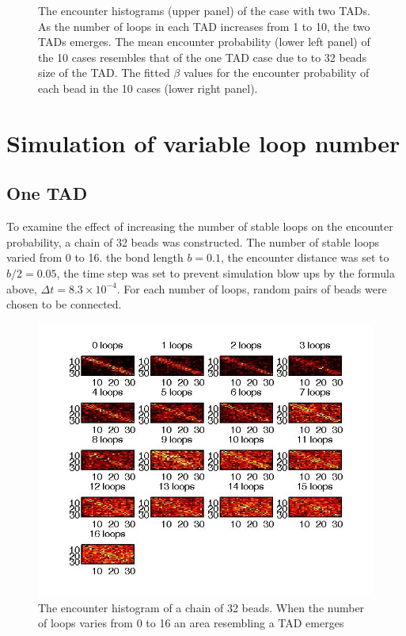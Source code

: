 \documentclass[12pt]{book}
\begin{document}
\begin{figure}[H]
\caption{\scriptsize{The encounter histograms (upper panel) of the case with two TADs. As the number of loops in each TAD increases from 1 to 10, the two TADs emerges. The mean encounter probability (lower left panel) of the 10 cases resembles that of the one TAD case due to to 32 beads size of the TAD. The fitted $\beta$ values for the encounter probability of each bead in the 10 cases (lower right panel).}}
\label{figure_randomLoopModel1To10Loops64BeadsTwoTADs}
\end{figure}

\section{Simulation of variable loop number}
\subsection{One TAD}
To examine the effect of increasing the number of stable loops on the encounter probability, a chain of 32 beads was constructed. The number of stable loops varied from 0 to 16. the bond length $b=0.1$, the encounter distance was set to $b/2=0.05$, the time step was set to prevent simulation blow ups by the formula above, $\Delta t=8.3\times10^{-4}$. For each number of loops, random pairs of beads were chosen to be connected. 
\begin{figure}[H]
\includegraphics[scale=0.4]{stableLoopModelVariableLoopNumber32Beads}
\caption{\scriptsize{The encounter histogram of a chain of 32 beads. When the number of loops varies from 0 to 16 an area resembling a TAD emerges}}
\label{figure_stableLoopModelVariableLoopNumber32Beads}
\end{figure}
\end{document}

